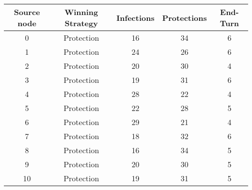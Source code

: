 \documentclass[results.tex]{subfiles}
\begin{document}
    \begin{center}
        \begin{tabular}{| c || c | c | c | c |}
            \hline
            {\bfseries Source node} & {\bfseries Winning Strategy} & {\bfseries Infections} & {\bfseries Protections}
            & {\bfseries End-Turn}
            \\  %
            \hline\hline
            0                       & Protection                   & 16                     & 34                      & 6                    \\
            \hline
            1                       & Protection                   & 24                     & 26                      & 6                    \\
            \hline
            2                       & Protection                   & 20                     & 30                      & 4                    \\
            \hline
            3                       & Protection                   & 19                     & 31                      & 6                    \\
            \hline
            4                       & Protection                   & 28                     & 22                      & 4                    \\
            \hline
            5                       & Protection                   & 22                     & 28                      & 5                    \\
            \hline
            6                       & Protection                   & 29                     & 21                      & 4                    \\
            \hline
            7                       & Protection                   & 18                     & 32                      & 6                    \\
            \hline
            8                       & Protection                   & 16                     & 34                      & 5                    \\
            \hline
            9                       & Protection                   & 20                     & 30                      & 5                    \\
            \hline
            10                      & Protection                   & 19                     & 31                      & 5                    \\

\end{tabular}
\end{center}
\end{document}
